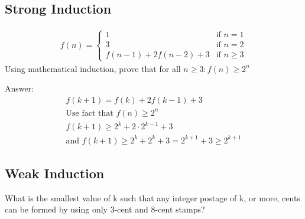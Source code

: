 \documentclass[landscape, letterpaper, 8pt]{extarticle}
\begin{document}
\begin{multicols}{3}
    \subsection*{Strong Induction}
    \begin{example}
        \begin{equation*}
            \begin{aligned}
                f(n) = \begin{cases}
                    1                   & \text{if }n=1      \\
                    3                   & \text{if }n=2      \\
                    f(n-1) + 2f(n-2) +3 & \text{if } n\geq 3
                \end{cases}
            \end{aligned}
        \end{equation*}
        Using mathematical induction, prove that for all $n \geq 3: f(n) \geq 2^n$

        Answer:
        \begin{equation*}
            \begin{aligned}
                f(k+1) =f(k)+ 2f(k-1)+3              \\
                \text{Use fact that $f(n) \geq 2^n$} \\
                f(k+1) \geq 2^k+2\cdot 2^{k-1} +3    \\
                \text{and } f(k+1) \geq 2^k + 2^k +3 = 2^{k+1} + 3 \geq 2^{k+1}
            \end{aligned}
        \end{equation*}
    \end{example}
    \subsection*{Weak Induction}
    \begin{example}
        What is the smallest value of k such that any integer postage of k, or
        more, cents can be formed by using only 3-cent and 8-cent stamps?


\end{example}
\end{multicols}
\end{document}
